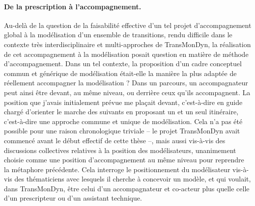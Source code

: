 \paragraph{De la prescription à l'accompagnement.}

Au-delà de la question de la faisabilité effective d'un tel projet d'accompagnement global à la modélisation d'un ensemble de transitions, rendu difficile dans le contexte très interdisciplinaire et multi-approches de TransMonDyn, la réalisation de cet \og accompagnement à la modélisation\fg{} posait question en matière de méthode d'accompagnement.
Dans un tel contexte, la proposition d'un cadre conceptuel commun et générique de modélisation était-elle la manière la plus adaptée de réellement \og accompagner\fg{} la modélisation ?
Dans un parcours, un accompagnateur peut ainsi être devant, au même niveau, ou derrière ceux qu'ils accompagnent.
La position que j'avais initialement prévue me plaçait \og devant\fg{}, c'est-à-dire en guide chargé d'orienter le marche des suivants en proposant un et un seul itinéraire, c'est-à-dire une approche commune et unique de modélisation.
Cela n'a pas été possible pour une raison chronologique triviale -- le projet TransMonDyn avait commencé avant le début effectif de cette thèse --, mais aussi vis-à-vis des discussions collectives relatives à la position des modélisateurs, unanimement choisie comme une position d'accompagnement \og au même niveau\fg{} pour reprendre la métaphore précédente.
Cela interroge le positionnement du modélisateur vis-à-vis des thématiciens \og avec\fg{} lesquels il cherche à concevoir un modèle, et qui voulait, dans TransMonDyn, être celui d'un \og accompagnateur\fg{} et co-acteur plus quelle celle d'un prescripteur ou d'un assistant technique.


